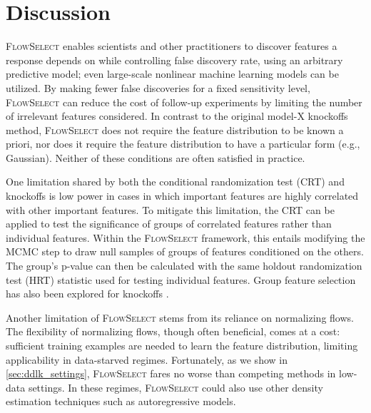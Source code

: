 \documentclass{article}
\newcommand{\FlowSelect}{\textsc{FlowSelect}\xspace}
\begin{document}
\section{Discussion}

\FlowSelect enables scientists and other practitioners to discover features a response depends on while controlling false discovery rate, using an arbitrary predictive model; even large-scale nonlinear machine learning models can be utilized.
By making fewer false discoveries for a fixed sensitivity level, \FlowSelect can reduce the cost of follow-up experiments by limiting the number of irrelevant features considered.
In contrast to the original model-X knockoffs method, \FlowSelect does not require the feature distribution to be known a priori, nor does it require the feature distribution to have a particular form (e.g., Gaussian). Neither of these conditions are often satisfied in practice.

One limitation shared by both the conditional randomization test (CRT) and knockoffs is low power in cases in which important features are highly correlated with other important features.
To mitigate this limitation, the CRT can be applied to test the significance of groups of correlated features rather than individual features.
Within the \FlowSelect framework, this entails modifying the MCMC step to draw null samples of groups of features conditioned on the others.
The group's p-value can then be calculated with the same holdout randomization test (HRT) statistic used for testing individual features.
Group feature selection has also been explored for knockoffs \citep{daiKnockoffFilterFDR2016,liuFastPowerfulConditional2020}.

Another limitation of \FlowSelect stems from its reliance on normalizing flows.
The flexibility of normalizing flows, though often beneficial, comes at a cost:
sufficient training examples are needed to learn the feature distribution, limiting applicability in data-starved regimes.
Fortunately, as we show in \cref{sec:ddlk_settings}, \FlowSelect fares no worse than competing methods in low-data settings.
In these regimes, \FlowSelect could also use other density estimation techniques such as autoregressive models.
\end{document}
